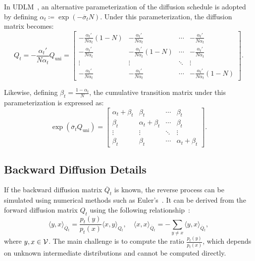         In UDLM~\citep{schiff2024discreteguidance}, an alternative parameterization of the diffusion schedule is adopted by defining $\alpha_t \coloneqq \exp(-\overline{\sigma}_t N)$. Under this parameterization, the diffusion matrix becomes:
        \begin{equation}
            Q_t = -\frac{\alpha_t'}{N\alpha_t} Q_{\text{uni}} =
            \begin{bmatrix}
                - \frac{\alpha_t'}{N\alpha_t}(1 - N) & -\frac{\alpha_t'}{N\alpha_t} & \cdots & -\frac{\alpha_t'}{N\alpha_t} \\
                -\frac{\alpha_t'}{N\alpha_t} & -\frac{\alpha_t'}{N\alpha_t}(1 - N) & \cdots & -\frac{\alpha_t'}{N\alpha_t} \\
                \vdots & \vdots & \ddots & \vdots \\
                -\frac{\alpha_t'}{N\alpha_t} & -\frac{\alpha_t'}{N\alpha_t} & \cdots & -\frac{\alpha_t'}{N\alpha_t}(1 - N)
            \end{bmatrix}.
        \end{equation}
        
        Likewise, defining $\beta_t = \frac{1 - \alpha_t}{N}$, the cumulative transition matrix under this parameterization is expressed as:
        \begin{equation}
            \exp(\overline{\sigma}_t Q_{\text{uni}}) =
            \begin{bmatrix}
                \alpha_t + \beta_t & \beta_t & \cdots & \beta_t \\
                \beta_t & \alpha_t + \beta_t & \cdots & \beta_t \\
                \vdots & \vdots & \ddots & \vdots \\
                \beta_t & \beta_t & \cdots & \alpha_t + \beta_t
            \end{bmatrix}.
        \end{equation}

    \subsection{Backward Diffusion Details}
    \label{app:backward_diffusion}
    If the backward diffusion matrix $\overline{Q}_t$ is known, the reverse process can be simulated using numerical methods such as Euler's~\citep{lou2024discrete}. It can be derived from the forward diffusion matrix $Q_t$ using the following relationship~\citep{kelly2011reversibility, campbell2022continuous, sun2022score}:
    \begin{equation*}
      \langle y, x\rangle_{\overline{Q}_{t}} = \frac{p_t(y)}{p_t(x)} \langle x, y \rangle_{Q_t}, \quad 
      \langle x, x\rangle_{\overline{Q}_{t}} = - \sum_{y \neq x} \langle y, x \rangle_{\overline{Q}_{t}},
    \end{equation*}
    where $y, x \in \mathcal{V}$. The main challenge is to compute the ratio $\frac{p_t(y)}{p_t(x)}$, which depends on unknown intermediate distributions and cannot be computed directly.
